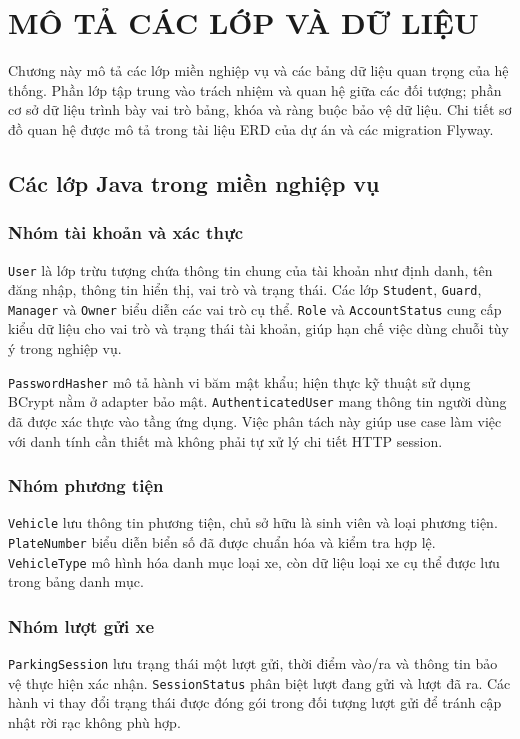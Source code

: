 \chapter{MÔ TẢ CÁC LỚP VÀ DỮ LIỆU}

Chương này mô tả các lớp miền nghiệp vụ và các bảng dữ liệu quan trọng của hệ thống. Phần lớp tập trung vào trách nhiệm và quan hệ giữa các đối tượng; phần cơ sở dữ liệu trình bày vai trò bảng, khóa và ràng buộc bảo vệ dữ liệu. Chi tiết sơ đồ quan hệ được mô tả trong tài liệu ERD của dự án và các migration Flyway.

\section{Các lớp Java trong miền nghiệp vụ}

\subsection{Nhóm tài khoản và xác thực}
\texttt{User} là lớp trừu tượng chứa thông tin chung của tài khoản như định danh, tên đăng nhập, thông tin hiển thị, vai trò và trạng thái. Các lớp \texttt{Student}, \texttt{Guard}, \texttt{Manager} và \texttt{Owner} biểu diễn các vai trò cụ thể. \texttt{Role} và \texttt{AccountStatus} cung cấp kiểu dữ liệu cho vai trò và trạng thái tài khoản, giúp hạn chế việc dùng chuỗi tùy ý trong nghiệp vụ.

\texttt{PasswordHasher} mô tả hành vi băm mật khẩu; hiện thực kỹ thuật sử dụng BCrypt nằm ở adapter bảo mật. \texttt{AuthenticatedUser} mang thông tin người dùng đã được xác thực vào tầng ứng dụng. Việc phân tách này giúp use case làm việc với danh tính cần thiết mà không phải tự xử lý chi tiết HTTP session.

\subsection{Nhóm phương tiện}
\texttt{Vehicle} lưu thông tin phương tiện, chủ sở hữu là sinh viên và loại phương tiện. \texttt{PlateNumber} biểu diễn biển số đã được chuẩn hóa và kiểm tra hợp lệ. \texttt{VehicleType} mô hình hóa danh mục loại xe, còn dữ liệu loại xe cụ thể được lưu trong bảng danh mục.

\subsection{Nhóm lượt gửi xe}
\texttt{ParkingSession} lưu trạng thái một lượt gửi, thời điểm vào/ra và thông tin bảo vệ thực hiện xác nhận. \texttt{SessionStatus} phân biệt lượt đang gửi và lượt đã ra. Các hành vi thay đổi trạng thái được đóng gói trong đối tượng lượt gửi để tránh cập nhật rời rạc không phù hợp.

